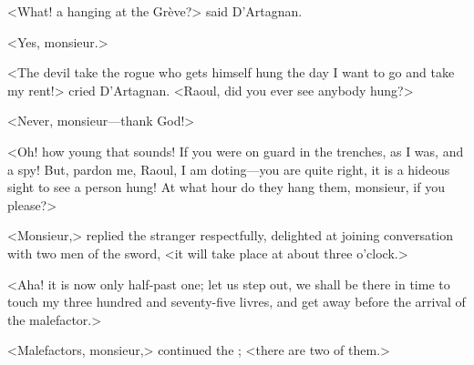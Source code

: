 <What! a hanging at the Grève?> said D'Artagnan.

<Yes, monsieur.>

<The devil take the rogue who gets himself hung the day I want to go and take my rent!> cried D'Artagnan. <Raoul, did you ever see anybody hung?>

<Never, monsieur—thank God!>

<Oh! how young that sounds! If you were on guard in the trenches, as I was, and a spy! But, pardon me, Raoul, I am doting—you are quite right, it is a hideous sight to see a person hung! At what hour do they hang them, monsieur, if you please?>

<Monsieur,> replied the stranger respectfully, delighted at joining conversation with two men of the sword, <it will take place at about three o'clock.>

<Aha! it is now only half-past one; let us step out, we shall be there in time to touch my three hundred and seventy-five livres, and get away before the arrival of the malefactor.>

<Malefactors, monsieur,> continued the ; <there are two of them.>

